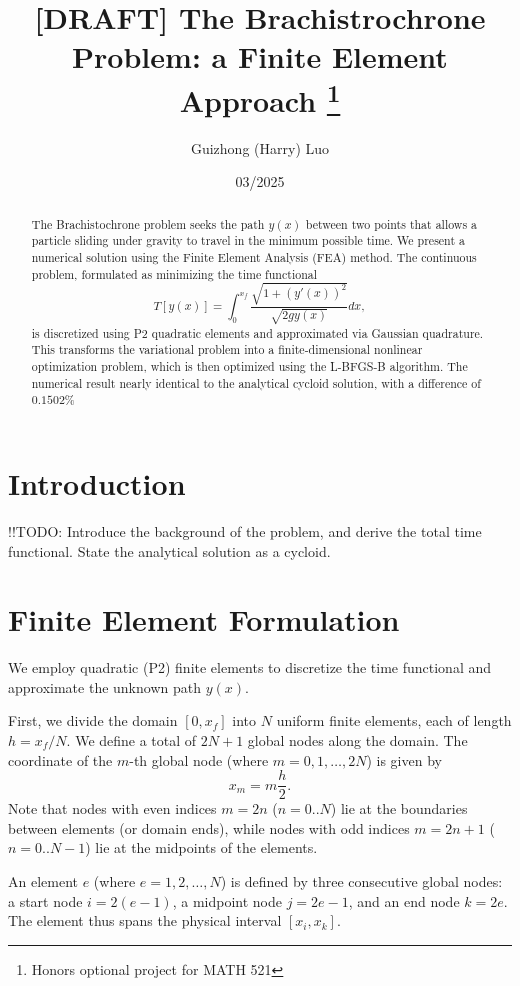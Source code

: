 \documentclass[11pt]{article}
\title{[DRAFT] The Brachistrochrone Problem: a Finite Element Approach \thanks{Honors optional project for MATH 521}}
\author{Guizhong (Harry) Luo}
\date{03/2025}
\begin{document}
\maketitle 
\begin{abstract}
    The Brachistochrone problem seeks the path \(y(x)\) between two points that allows a particle sliding under gravity to travel in the minimum possible time. We present a numerical solution using the Finite Element Analysis (FEA) method. The continuous problem, formulated as minimizing the time functional 
    \begin{equation}
    T[y(x)] = \int_0^{x_f} \frac{\sqrt{1 + (y'(x))^2}}{\sqrt{2gy(x)}} dx,
    \label{eq:T}
    \end{equation}
        is discretized using P2 quadratic elements and approximated via Gaussian quadrature. This transforms the variational problem into a finite-dimensional nonlinear optimization problem, which is then optimized using the L-BFGS-B algorithm. 
    The numerical result nearly identical to the analytical cycloid solution, with a difference of \(0.1502\%\)
\end{abstract}


\section{Introduction}
!!TODO: Introduce the background of the problem, and derive the total time functional. State the analytical solution as a cycloid.

\section{Finite Element Formulation}
    
    We employ quadratic (P2) finite elements to discretize the time functional and approximate the unknown path \(y(x)\).
    
    First, we divide the domain \( \left[0, x_f\right] \) into \(N \) uniform finite elements, each of length \( h = x_f / N \). We define a total of \(2N+1\) global nodes along the domain. The coordinate of the \(m\)-th global node (where \(m = 0, 1, \ldots, 2N\)) is given by
    \[ x_m = m \frac{h}{2}. \]
    Note that nodes with even indices \(m=2n\) ($n=0..N$) lie at the boundaries between elements (or domain ends), while nodes with odd indices \(m=2n+1\) ($n=0..N-1$) lie at the midpoints of the elements.
    
    An element \(e\) (where \(e = 1, 2, \ldots, N\)) is defined by three consecutive global nodes: a start node \(i = 2(e-1)\), a midpoint node \(j = 2e-1\), and an end node \(k = 2e\). The element thus spans the physical interval \( [x_i, x_k] \).
    
\end{document}
